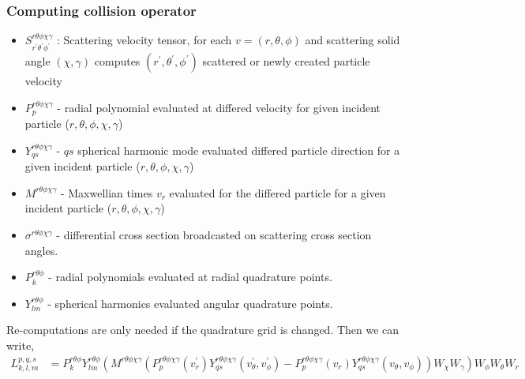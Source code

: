 \documentclass[mathserif, aspectratio=169]{beamer}
\begin{document}
	\begin{frame}
		\frametitle{Computing collision operator}
		\begin{itemize}
			\item $S^{r\theta\phi\chi\gamma}_{r^\prime\theta^\prime \phi^\prime}$ : Scattering velocity tensor, for each $v=(r,\theta,\phi)$ and scattering solid angle $(\chi,\gamma)$ computes $(r^\prime,\theta^\prime,\phi^\prime)$ scattered or newly created particle velocity
			\item $P^{r\theta\phi\chi\gamma}_{p}$ - radial polynomial evaluated at differed velocity for given incident particle ($r,\theta,\phi,\chi,\gamma$)
			\item $Y^{r\theta\phi\chi\gamma}_{qs}$ - $qs$ spherical harmonic mode evaluated differed particle direction for a given incident particle ($r,\theta,\phi,\chi,\gamma$)
			\item $M^{r\theta\phi\chi\gamma}$ - Maxwellian times $v_r$ evaluated for the differed particle for a given incident particle ($r,\theta,\phi,\chi,\gamma$)
			\item $\sigma^{r\theta\phi\chi\gamma}$ - differential cross section broadcasted on scattering cross section angles. 
			\item $P^{r\theta\phi}_{k}$ - radial polynomials evaluated at radial quadrature points. 
			\item $Y_{lm}^{r\theta\phi}$ - spherical harmonics evaluated angular quadrature points. 
		\end{itemize}
		Re-computations are only needed if the quadrature grid is changed. Then we can write, 
		\tiny
		{
			\begin{align*}
				{L}_{k,l,m}^{p,q,s} &=P^{r\theta\phi}_{k} Y_{lm}^{r\theta\phi} \left( M^{r\theta\phi\chi\gamma} \left(P^{r\theta\phi\chi\gamma}_{p} (v^\prime_r)	Y^{r\theta\phi\chi\gamma}_{qs} (v^\prime_\theta,v^{\prime}_\phi) - P^{r\theta\phi\chi\gamma}_{p} (v_r)	Y^{r\theta\phi\chi\gamma}_{qs} (v_\theta,v_\phi) \right) W_\chi W_\gamma \right) W_\phi W_\theta W_r
			\end{align*}
		}%
	\end{frame}
\end{document}
